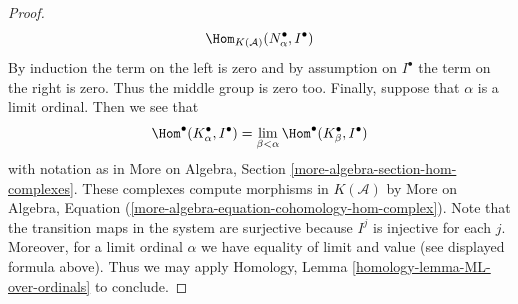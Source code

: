 \begin{proof}
$$\Hom_{K(\mathcal{A})}(N_\alpha^\bullet, I^\bullet)
$$
By induction the term on the left is zero and by assumption on $I^\bullet$
the term on the right is zero. Thus the middle group is zero too.
Finally, suppose that $\alpha$ is a limit ordinal. Then we see that
$$
\Hom^\bullet(K_\alpha^\bullet, I^\bullet) =
\lim_{\beta < \alpha} \Hom^\bullet(K_\beta^\bullet, I^\bullet)
$$
with notation as in
More on Algebra, Section \ref{more-algebra-section-hom-complexes}.
These complexes compute morphisms in $K(\mathcal{A})$ by
More on Algebra, Equation
(\ref{more-algebra-equation-cohomology-hom-complex}).
Note that the transition maps in the system are surjective
because $I^j$ is injective for each $j$. Moreover, for a limit
ordinal $\alpha$ we have equality of limit and value
(see displayed formula above). Thus we may apply
Homology, Lemma \ref{homology-lemma-ML-over-ordinals}
to conclude.
\end{proof}
